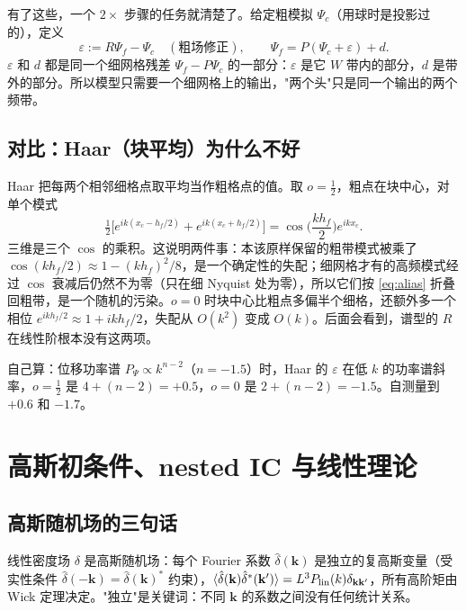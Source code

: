 \documentclass[11pt,UTF8,fontset=none]{ctexart}
\newcommand{\kk}{\mathbf{k}}
\newenvironment{box*}{\begin{quote}\itshape}{\end{quote}}
\begin{document}
有了这些，一个 $2\times$ 步骤的任务就清楚了。给定粗模拟 $\Psi_c$（用球时是投影过的），定义
\begin{equation}
\varepsilon:=R\Psi_f-\Psi_c\quad(\text{粗场修正}),\qquad \Psi_f=P(\Psi_c+\varepsilon)+d .
\label{eq:eps}
\end{equation}
$\varepsilon$ 和 $d$ 都是同一个细网格残差 $\Psi_f-P\Psi_c$ 的一部分：$\varepsilon$ 是它 $W$ 带内的部分，$d$ 是带外的部分。所以模型只需要一个细网格上的输出，"两个头"只是同一个输出的两个频带。

\subsection{对比：Haar（块平均）为什么不好}

Haar 把每两个相邻细格点取平均当作粗格点的值。取 $o=\tfrac12$，粗点在块中心，对单个模式
\begin{equation}
\tfrac12\Big[e^{ik(x_c-h_f/2)}+e^{ik(x_c+h_f/2)}\Big]=\cos\!\Big(\frac{kh_f}{2}\Big)e^{ikx_c}.
\end{equation}
三维是三个 $\cos$ 的乘积。这说明两件事：本该原样保留的粗带模式被乘了 $\cos(kh_f/2)\approx1-(kh_f)^2/8$，是一个确定性的失配；细网格才有的高频模式经过 $\cos$ 衰减后仍然不为零（只在细 Nyquist 处为零），所以它们按 \eqref{eq:alias} 折叠回粗带，是一个随机的污染。$o=0$ 时块中心比粗点多偏半个细格，还额外多一个相位 $e^{ikh_f/2}\approx1+ikh_f/2$，失配从 $O(k^2)$ 变成 $O(k)$。后面会看到，谱型的 $R$ 在线性阶根本没有这两项。

\begin{box*}
自己算：位移功率谱 $P_\Psi\propto k^{n-2}$（$n=-1.5$）时，Haar 的 $\varepsilon$ 在低 $k$ 的功率谱斜率，$o=\tfrac12$ 是 $4+(n-2)=+0.5$，$o=0$ 是 $2+(n-2)=-1.5$。自测量到 $+0.6$ 和 $-1.7$。
\end{box*}

\section{高斯初条件、nested IC 与线性理论}

\subsection{高斯随机场的三句话}

线性密度场 $\delta$ 是高斯随机场：每个 Fourier 系数 $\hat\delta(\kk)$ 是独立的复高斯变量（受实性条件 $\hat\delta(-\kk)=\hat\delta(\kk)^*$ 约束），$\langle\hat\delta(\kk)\hat\delta^*(\kk')\rangle=L^3P_{\rm lin}(k)\delta_{\kk\kk'}$，所有高阶矩由 Wick 定理决定。"独立"是关键词：不同 $\kk$ 的系数之间没有任何统计关系。
\end{document}
